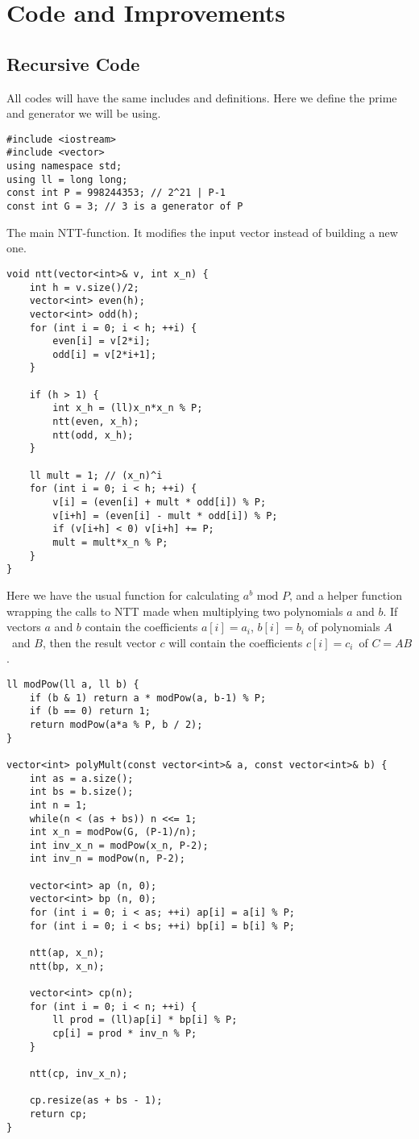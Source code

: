 \documentclass{article}
\begin{document}
\section{Code and Improvements}
\subsection{Recursive Code}
All codes will have the same includes and definitions. Here we define the prime and generator we will be using.
\begin{lstlisting}
#include <iostream>
#include <vector>
using namespace std;
using ll = long long;
const int P = 998244353; // 2^21 | P-1
const int G = 3; // 3 is a generator of P
\end{lstlisting}

The main NTT-function. It modifies the input vector instead of building a new one.
\begin{lstlisting}
void ntt(vector<int>& v, int x_n) {
	int h = v.size()/2;
	vector<int> even(h);
	vector<int> odd(h);
	for (int i = 0; i < h; ++i) {
		even[i] = v[2*i];
		odd[i] = v[2*i+1];
	}

	if (h > 1) {
		int x_h = (ll)x_n*x_n % P;
		ntt(even, x_h);
		ntt(odd, x_h);
	}

	ll mult = 1; // (x_n)^i
	for (int i = 0; i < h; ++i) {
		v[i] = (even[i] + mult * odd[i]) % P;
		v[i+h] = (even[i] - mult * odd[i]) % P;
		if (v[i+h] < 0) v[i+h] += P;
		mult = mult*x_n % P;
	}
}
\end{lstlisting}
Here we have the usual function for calculating $a^{b} \text{ mod } P$, and a helper function
wrapping the calls to NTT made when multiplying two polynomials $a$ and $b$. If vectors $a$ and $b$
contain the coefficients $a[i] = a_{i}$, $b[i] = b_{i}$ of polynomials $A$ and $B$, then the result
vector $c$ will contain the coefficients $c[i] = c_{i}$ of $C = AB$.
\begin{lstlisting}
ll modPow(ll a, ll b) {
	if (b & 1) return a * modPow(a, b-1) % P;
	if (b == 0) return 1;
	return modPow(a*a % P, b / 2);
}

vector<int> polyMult(const vector<int>& a, const vector<int>& b) {
	int as = a.size();
	int bs = b.size();
	int n = 1;
	while(n < (as + bs)) n <<= 1;
	int x_n = modPow(G, (P-1)/n);
	int inv_x_n = modPow(x_n, P-2);
	int inv_n = modPow(n, P-2);

	vector<int> ap (n, 0);
	vector<int> bp (n, 0);
	for (int i = 0; i < as; ++i) ap[i] = a[i] % P;
	for (int i = 0; i < bs; ++i) bp[i] = b[i] % P;
	
	ntt(ap, x_n);
	ntt(bp, x_n);

	vector<int> cp(n);
	for (int i = 0; i < n; ++i) {
		ll prod = (ll)ap[i] * bp[i] % P;
		cp[i] = prod * inv_n % P;
	}

	ntt(cp, inv_x_n);

	cp.resize(as + bs - 1);
	return cp;
}
\end{lstlisting}
\end{document}

